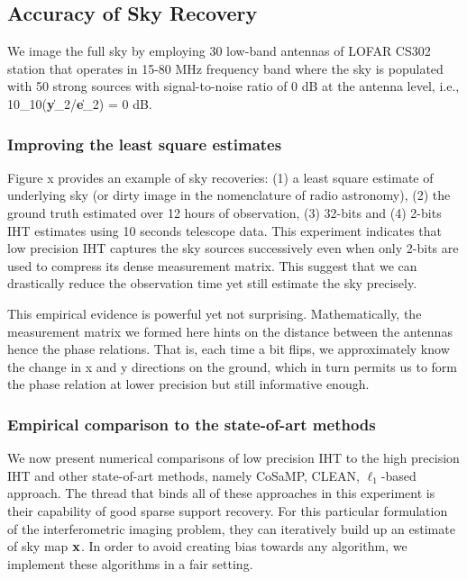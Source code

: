 \documentclass{article}
\begin{document}
\subsection{Accuracy of Sky Recovery}
We image the full sky by employing 30 low-band antennas of LOFAR CS302 station that operates in 15-80 MHz frequency band where the sky is populated with 50 strong sources with signal-to-noise ratio of 0 dB at the antenna level, i.e., 10\log_10(\|{\bf y}\|_2/\|{\bf e}\|_2) = 0 dB. 
\subsubsection{Improving the least square estimates}
Figure x provides an example of sky recoveries: (1) a least square estimate of underlying sky (or dirty image in the nomenclature of radio astronomy), (2) the ground truth estimated over 12 hours of observation, (3) 32-bits and (4) 2-bits IHT estimates using 10 seconds telescope data. This experiment indicates that low precision IHT captures the sky sources successively even when only 2-bits are used to compress its dense measurement matrix. This suggest that we can drastically reduce the observation time yet still estimate the sky precisely.





This empirical evidence is powerful yet not surprising. Mathematically, the measurement matrix we formed here hints on the distance between the antennas hence the phase relations. That is, each time a bit flips, we approximately know the change in x and y directions on the ground, which in turn permits us to form the phase relation at lower precision but still informative enough. 


\subsubsection{Empirical comparison to the state-of-art methods}

We now present numerical comparisons of low precision IHT to the high precision IHT and other state-of-art methods, namely CoSaMP, CLEAN, $\ell_1$-based approach. The thread that binds all of these approaches in this experiment is their capability of good sparse support recovery. For this particular formulation of the interferometric imaging problem, they can iteratively build up an estimate of sky map ${\bf x}$. In order to avoid creating bias towards any algorithm, we implement these algorithms in a fair setting.
\end{document}
